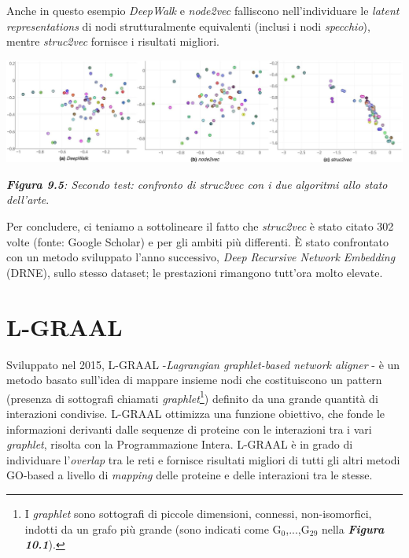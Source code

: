 \documentclass[11pt]{article}
\begin{document}
Anche in questo esempio \textit{DeepWalk} e \textit{node2vec} falliscono nell'individuare le \textit{latent representations} di nodi strutturalmente equivalenti (inclusi i nodi \textit{specchio}), mentre \textit{struc2vec} fornisce i risultati migliori.

\begin{center}
\includegraphics[scale=0.35]{a4}

\begin{small}\textit{\textbf{Figura 9.5}: Secondo test: confronto di struc2vec con i due algoritmi allo stato dell'arte}.\end{small}
\end{center}

Per concludere, ci teniamo a sottolineare il fatto che \textit{struc2vec} è stato citato 302 volte (fonte: Google Scholar) e per gli ambiti più differenti. \`E stato confrontato con un metodo sviluppato l'anno successivo, \textit{Deep Recursive Network Embedding} (DRNE), sullo stesso dataset; le prestazioni rimangono tutt'ora molto elevate.

\pagebreak
\section{L-GRAAL}
Sviluppato nel 2015, L-GRAAL -\textit{Lagrangian graphlet-based network aligner} - è un metodo basato sull'idea di mappare insieme nodi che costituiscono un pattern (presenza di sottografi chiamati \textit{graphlet}\footnote{I \textit{graphlet} sono sottografi di piccole dimensioni, connessi, non-isomorfici, indotti da un grafo più grande (sono indicati come G$_0$,...,G$_{29}$ nella \textit{\textbf{Figura 10.1}}).}) definito da una grande quantità di interazioni condivise. L-GRAAL ottimizza una funzione obiettivo, che fonde le informazioni derivanti dalle sequenze di proteine con le interazioni tra i vari \textit{graphlet}, risolta con la Programmazione Intera. L-GRAAL è in grado di individuare l'\textit{overlap} tra le reti e fornisce risultati migliori di tutti gli altri metodi GO-based a livello di \textit{mapping} delle proteine e delle interazioni tra le stesse.\\
\end{document}
